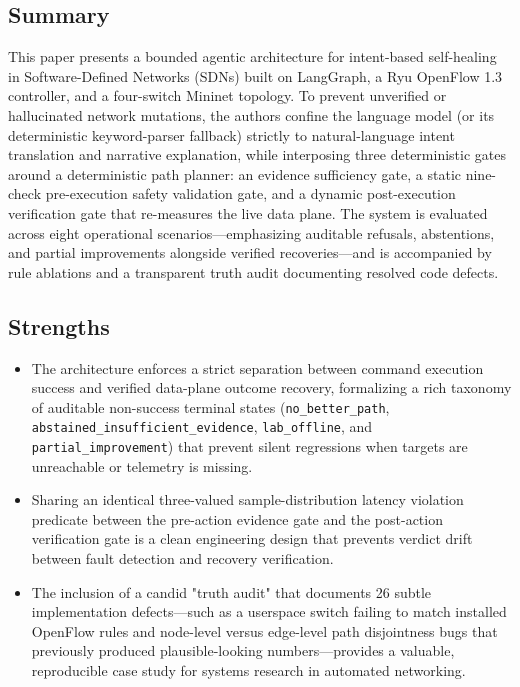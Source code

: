 \documentclass[11pt,a4paper]{article}
\begin{document}
\subsection*{Summary}
This paper presents a bounded agentic architecture for intent-based self-healing in Software-Defined Networks (SDNs) built on LangGraph, a Ryu OpenFlow 1.3 controller, and a four-switch Mininet topology. To prevent unverified or hallucinated network mutations, the authors confine the language model (or its deterministic keyword-parser fallback) strictly to natural-language intent translation and narrative explanation, while interposing three deterministic gates around a deterministic path planner: an evidence sufficiency gate, a static nine-check pre-execution safety validation gate, and a dynamic post-execution verification gate that re-measures the live data plane. The system is evaluated across eight operational scenarios—emphasizing auditable refusals, abstentions, and partial improvements alongside verified recoveries—and is accompanied by rule ablations and a transparent truth audit documenting resolved code defects.
\subsection*{Strengths}
\begin{itemize}[leftmargin=1.8em,itemsep=2pt]
\item The architecture enforces a strict separation between command execution success and verified data-plane outcome recovery, formalizing a rich taxonomy of auditable non-success terminal states (\texttt{no\_better\_path}, \texttt{abstained\_insufficient\_evidence}, \texttt{lab\_offline}, and \texttt{partial\_improvement}) that prevent silent regressions when targets are unreachable or telemetry is missing.
\item Sharing an identical three-valued sample-distribution latency violation predicate between the pre-action evidence gate and the post-action verification gate is a clean engineering design that prevents verdict drift between fault detection and recovery verification.
\item The inclusion of a candid "truth audit" that documents 26 subtle implementation defects—such as a userspace switch failing to match installed OpenFlow rules and node-level versus edge-level path disjointness bugs that previously produced plausible-looking numbers—provides a valuable, reproducible case study for systems research in automated networking.
\end{itemize}
\end{document}
